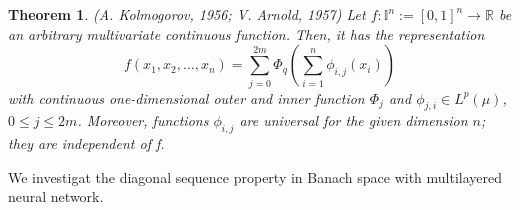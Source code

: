 \documentclass{article}
\newtheorem{theorem}{Theorem}[section]
\begin{document}

\begin{theorem}
	 (\textit{A. Kolmogorov, 1956; V. Arnold, 1957}) Let $f : \mathbb{I}^{n} := [0,1]^{n} \rightarrow\mathbb{R}$ be an arbitrary multivariate continuous function. Then, it has the representation
	 \begin{equation}
	 f(x_1,x_2, \dots, x_n)=\sum_{j=0}^{2m}\Phi_{q}\left(\sum_{i=1}^{n}\phi_{i,j}(x_i)\right)
	 \label{eq:komo}
	 \end{equation}
	 with continuous one-dimensional outer and inner function $\Phi_{j}$ and $\phi_{j,i}\in L^p(\mu)$, $0\le j\le 2m$.
Moreover, functions $\phi_{i,j}$ are universal for the given dimension $n$; they are independent of f.
	\end{theorem}


We investigat the diagonal sequence property in Banach space with multilayered neural network. 
\end{document}
